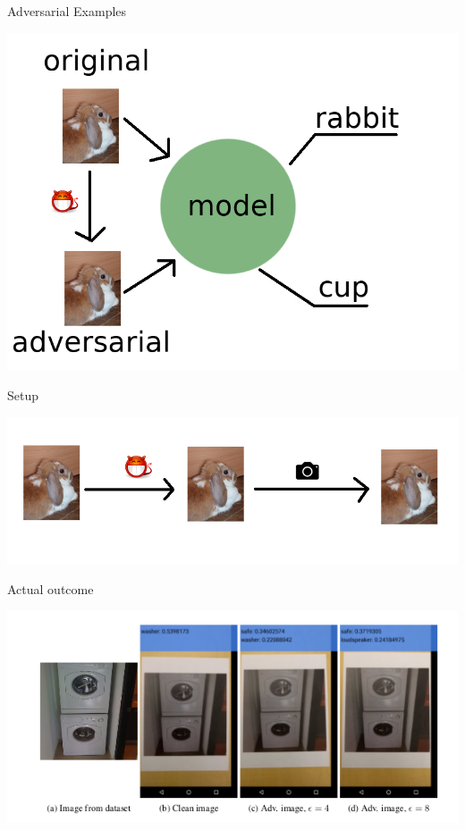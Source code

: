 \documentclass[15pt]{beamer}
\begin{document}
\begin{frame}{Adversarial Examples}
  \begin{center}
  \includegraphics[width=0.75\linewidth]{adversarial.png}
  \end{center}
\end{frame}


\begin{frame}{Setup}
  \begin{center}
  \includegraphics[width=0.9\linewidth]{photo.png}
  \vskip0.1in
  \begin{huge}
  \bcquestion
  \end{huge}
  \end{center}
\end{frame}


\begin{frame}{Actual outcome}
  \begin{center}
  \includegraphics[width=\linewidth]{washer.png}
  \end{center}
\end{frame}
\end{document}
